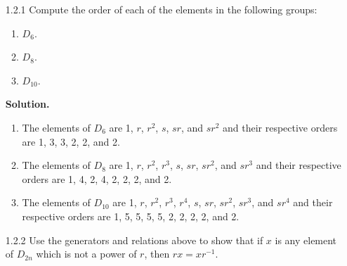 \begin{enumerate}
      \textbf{Proof.} Let $P$ be a platonic solid with $f$ faces and $n$
      vertices per face. Denote the faces of $P$ (arbitrarily) by $F_1$, $F_2$,
      $\ldots$, $F_f$. Observe that given any face $F_i$, there is a symmetry 
      that sends face $F_1$ to $F_i$. Now fix face $F_1$ in this new position. 
      Now notice that any of the $n$ vertices on face $F_1$ can be sent to any
      of the other $n-1$ vertices by rotation through an axis that passes
      through the center of $F_1$. Thus there are $f \cdot n$ positions that
      face $F_1$ may be sent to. Since symmetries are rigid motions, it follows 
      that once the position of face $F_1$ has been specified, then the
      positions of the other faces are completely determined. Thus there are
      $f \cdot n$ rigid motions of $P$. \qed
   \item[1.2.1]   Compute the order of each of the elements in the following
                  groups:
                  \begin{enumerate}
                     \item $D_6$.
                     \item $D_8$.
                     \item $D_{10}$.
                  \end{enumerate}
                 
      \textbf{Solution.}
      
      \begin{enumerate}
         \item The elements of $D_6$ are 1, $r$, $r^2$, $s$, $sr$, and $sr^2$
               and their respective orders are 1, 3, 3, 2, 2, and 2.
         \item The elements of $D_8$ are 1, $r$, $r^2$, $r^3$, $s$, $sr$,
               $sr^2$, and $sr^3$ and their respective orders are 1, 4, 2, 4, 2,
               2, 2, and 2.
         \item The elements of $D_{10}$ are 1, $r$, $r^2$, $r^3$, $r^4$, $s$,
               $sr$, $sr^2$, $sr^3$, and $sr^4$ and their respective orders are
               1, 5, 5, 5, 5, 2, 2, 2, 2, and 2.
      \end{enumerate}
   \item[1.2.2]   Use the generators and relations above to show that if $x$ is
                  any element of $D_{2n}$ which is not a power of $r$, then
                  $rx = xr^{-1}$. 
                  

\end{enumerate}
